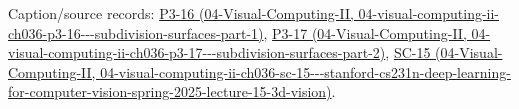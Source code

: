 Caption/source records: \href{../04-Visual-Computing-II/main.pdf\#nameddest=04-visual-computing-ii-ch036-p3-16---subdivision-surfaces-part-1}{P3-16 (04-Visual-Computing-II, 04-visual-computing-ii-ch036-p3-16-\/-\/-subdivision-surfaces-part-1)}, \href{../04-Visual-Computing-II/main.pdf\#nameddest=04-visual-computing-ii-ch036-p3-17---subdivision-surfaces-part-2}{P3-17 (04-Visual-Computing-II, 04-visual-computing-ii-ch036-p3-17-\/-\/-subdivision-surfaces-part-2)}, \href{../04-Visual-Computing-II/main.pdf\#nameddest=04-visual-computing-ii-ch036-sc-15---stanford-cs231n-deep-learning-for-computer-vision-spring-2025-lecture-15-3d-vision}{SC-15 (04-Visual-Computing-II, 04-visual-computing-ii-ch036-sc-15-\/-\/-stanford-cs231n-deep-learning-for-computer-vision-spring-2025-lecture-15-3d-vision)}.
